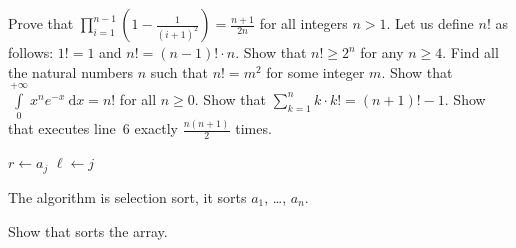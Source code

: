 \begin{chapterendexercises}
        Prove that
        $\prod_{i = 1}^{n - 1} \left(1 - \frac{1}{(i + 1)^2} \right) =
        \frac{n + 1}{2n}$ for all integers $n > 1$.
    \exercise Let us define $n!$ as follows: $1! = 1$ and
      $n! = (n - 1)! \cdot n$. Show that $n! \ge 2^n$ for any $n \ge 4$.
    \exercise[open] Find all the natural numbers $n$ such that $n! = m^2$ for
      some integer $m$.
    \exercise Show that
        $\int\limits_0^{+\infty} x^n e^{- x} ~ \mathrm{d}x = n!$
        for all $n \ge 0$.
    \exercise Show that $\sum_{k = 1}^n k \cdot k! = (n + 1)! - 1$.
    \exercise Show that  executes line~6 exactly
      $\frac{n (n + 1)}{2}$ times.
      \begin{algorithm}
        \begin{algorithmic}[1]
                  \State $r \gets a_j$
                  \State $\ell \gets j$
                \EndIf
              \EndFor
            \EndFor
          \EndFunction
        \end{algorithmic}
        \caption{The algorithm is selection sort, it sorts $a_1$, \dots, $a_n$.}
        \label{algorithm:selection-sort}
      \end{algorithm}
    \exercise Show that  sorts the array.
\end{chapterendexercises}
